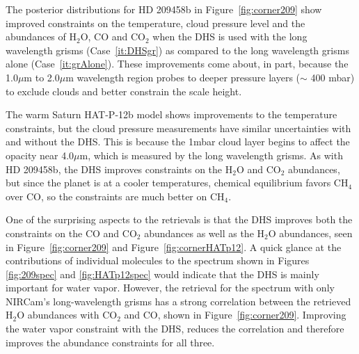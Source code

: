 \documentclass[iop]{emulateapj}
\begin{document}
The posterior distributions for HD 209458b in Figure~\ref{fig:corner209} show improved constraints on the temperature, cloud pressure level and the abundances of H$_2$O, CO and CO$_2$ when the DHS is used with the long wavelength grisms (Case~\ref{it:DHSgr}) as compared to the long wavelength grisms alone (Case~\ref{it:grAlone}).
These improvements come about, in part, because the 1.0$\mu$m to 2.0$\mu$m wavelength region probes to deeper pressure layers ($\sim$ 400 mbar) to exclude clouds and better constrain the scale height.




The warm Saturn HAT-P-12b model shows improvements to the temperature constraints, but the cloud pressure measurements have similar uncertainties with and without the DHS.
This is because the 1mbar cloud layer begins to affect the opacity near 4.0$\mu$m, which is measured by the long wavelength grisms.
As with HD 209458b, the DHS improves constraints on the H$_2$O and CO$_2$ abundances, but since the planet is at a cooler temperatures, chemical equilibrium favors CH$_4$ over CO, so the constraints are much better on CH$_4$.


One of the surprising aspects to the retrievals is that the DHS improves both the constraints on the CO and CO$_2$ abundances as well as the H$_2$O abundances, seen in Figure~\ref{fig:corner209} and Figure~\ref{fig:cornerHATp12}. 
A quick glance at the contributions of individual molecules to the spectrum shown in Figures \ref{fig:209spec} and \ref{fig:HATp12spec} would indicate that the DHS is mainly important for water vapor.
However, the retrieval for the spectrum with only NIRCam's long-wavelength grisms has a strong correlation between the retrieved H$_2$O abundances with CO$_2$ and CO, shown in Figure~\ref{fig:corner209}.
Improving the water vapor constraint with the DHS, reduces the correlation and therefore improves the abundance constraints for all three.
\end{document}
